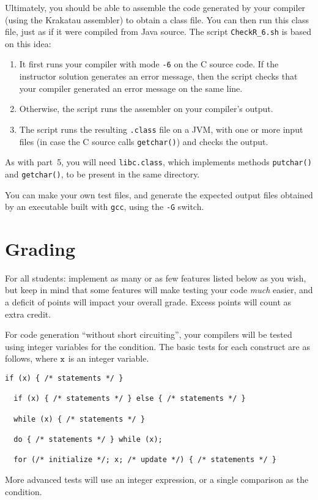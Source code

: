 \documentclass{article}
\newcommand{\codegen}{5}
\newcommand{\flowgen}{6}
\begin{document}
Ultimately,
you should be able to assemble the code generated by your compiler
(using the Krakatau assembler)
to obtain a class file.
You can then run this class file,
just as if it were compiled from Java source.
The script {\tt CheckR\_6.sh} is based on this idea:
\begin{enumerate}
  \item
  It first runs your compiler with mode {\tt -\flowgen{}} on the C source code.
  If the instructor solution generates an error message,
  then the script checks that your compiler generated an error message
  on the same line.

  \item
  Otherwise, the script runs the assembler on your compiler's output.

  \item
  The script runs the resulting {\tt .class} file on a JVM,
  with one or more input files
  (in case the C source calls {\tt getchar()})
  and checks the output.
\end{enumerate}
As with part~\codegen,
you will need {\tt libc.class},
which implements methods {\tt putchar()} and {\tt getchar()},
to be present in the same directory.

You can make your own test files,
and generate the expected output files
obtained by an executable built with {\tt gcc},
using the {\tt -G} switch.

\section{Grading} \label{SEC:grading}

For all students: implement as many or as few features listed below as you wish,
but keep in mind that some features will make testing your code \emph{much}
easier, and a deficit of points will impact your overall grade.
Excess points will count as extra credit.

For code generation ``without short circuiting'',
your compilers will be tested using integer variables
for the condition.
The basic tests for each construct are as follows,
where ${\tt x}$ is an integer variable.
\begin{lstlisting}[numbers=none]
  if (x) { /* statements */ }

  if (x) { /* statements */ } else { /* statements */ }

  while (x) { /* statements */ }

  do { /* statements */ } while (x);

  for (/* initialize */; x; /* update */) { /* statements */ }
\end{lstlisting}
More advanced tests will use an integer expression,
or a single comparison as the condition.
\end{document}
